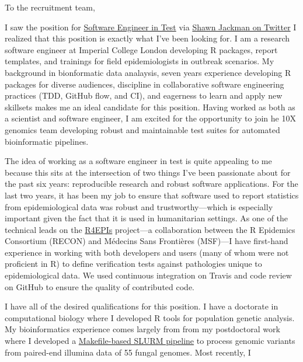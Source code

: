 \vspace{1ex}
To the recruitment team,

\vspace{1ex}

I saw the position for
\href{https://boards.greenhouse.io/10xgenomics/jobs/1769868?gh_jid=1769868#application}{Software
Engineer in Test} via
\href{https://twitter.com/sjackman/status/1189977010908454912?s=20}{Shawn
Jackman on Twitter} I realized that this position is exactly what I've been
looking for. I am a research software engineer at Imperial College London
developing R packages, report templates, and trainings for field
epidemiologists in outbreak scenarios. My background in bionformatic data
analaysis, seven years experience developing R packages for diverse audiences,
discipline in collaborative software engineering practices (TDD, GitHub flow,
and CI), and eagerness to learn and apply new skillsets makes me an ideal
candidate for this position. Having worked as both as a scientist and software
engineer, I am excited for the opportunity to join he 10X genomics team
developing robust and maintainable test suites for automated bioinformatic
pipelines.

\vspace{1ex}

The idea of working as a software engineer in test is quite appealing to me
because this sits at the intersection of two things I've been passionate about
for the past six years: reproducible research and robust software applications.
For the last two years, it has been my job to ensure that software used to
report statistics from epidemiological data was robust and trustworthy---which
is especially important given the fact that it is used in humanitarian
settings. As one of the technical leads on the
\href{https://r4epis.netlify.com}{R4EPIs} project---a collaboration between the
R Epidemics Consortium (RECON) and M\'{e}decins Sans Fronti\`{e}res (MSF)---I
have first-hand experience in working with both developers and users (many of
whom were not proficient in R) to define verification tests against pathologies
unique to epidemiological data. We used continuous integration on Travis and
code review on GitHub to ensure the quality of contributed code.

\vspace{1ex}

I have all of the desired qualifications for this position. I have a doctorate
in computational biology where I developed R tools for population genetic
analysis. My bioinformatics experience comes largely from from my postdoctoral
work where I developed a
\href{https://github.com/zkamvar/read-processing}{Makefile-based SLURM
pipeline} to process genomic variants from paired-end illumina data of 55
fungal genomes. Most recently, I 



